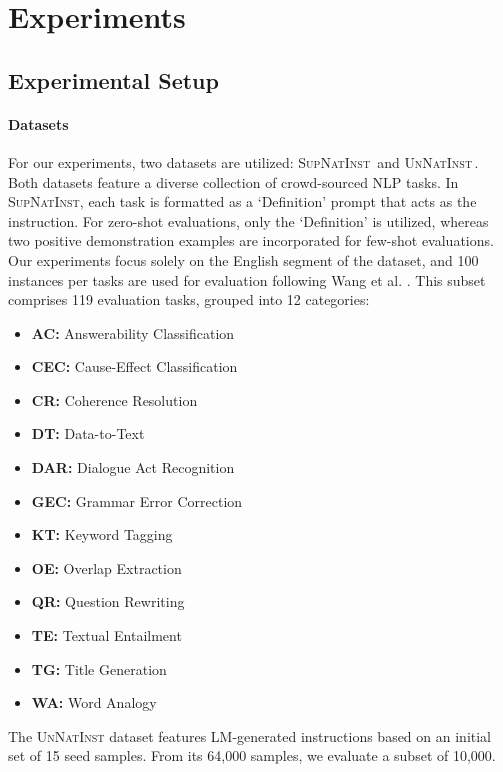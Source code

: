 \vspace{-10pt}
\section{Experiments}
\label{sec3:experiment}
\vspace{-5pt}
\subsection{Experimental Setup}
\vspace{-5pt}
\paragraph{Datasets} 
For our experiments, two datasets are utilized: \textsc{SupNatInst}\,\citep{sni_dataset} and \textsc{UnNatInst}\,\citep{unnatural_ni_dataset}. Both datasets feature a diverse collection of crowd-sourced NLP tasks. In \textsc{SupNatInst}, each task is formatted as a `Definition' prompt that acts as the instruction. For zero-shot evaluations, only the `Definition' is utilized, whereas two positive demonstration examples are incorporated for few-shot evaluations. Our experiments focus solely on the English segment of the dataset, and 100 instances per tasks are used for evaluation following Wang et al. \citep{sni_dataset}. This subset comprises 119 evaluation tasks, grouped into 12 categories:
%
\small
\vspace{-1pt}
\begin{multicols}{3}
    \begin{itemize}[left=0pt, wide, labelsep=2.5pt]
        \item \textbf{AC:} Answerability Classification
        \item \textbf{CEC:} Cause-Effect Classification
        \item \textbf{CR:} Coherence Resolution
        \item \textbf{DT:} Data-to-Text
        \item \textbf{DAR:} Dialogue Act Recognition
        \item \textbf{GEC:} Grammar Error Correction
        \item \textbf{KT:} Keyword Tagging
        \item \textbf{OE:} Overlap Extraction
        \item \textbf{QR:} Question Rewriting
        \item \textbf{TE:} Textual Entailment
        \item \textbf{TG:} Title Generation
        \item \textbf{WA:} Word Analogy
    \end{itemize}
\end{multicols}
\normalsize
\vspace{-10pt}
%
The \textsc{UnNatInst} dataset features LM-generated instructions based on an initial set of 15 seed samples. From its 64,000 samples, we evaluate a subset of 10,000.

